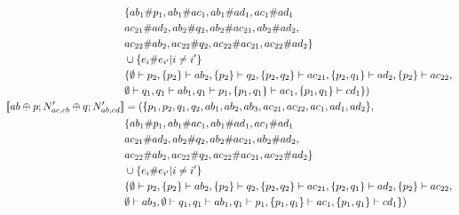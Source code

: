 \begin{example}
\begin{align*}
         & \{ab_1\#p_1,ab_1\#ac_1,ab_1\#ad_1,ac_1\#ad_1 \\
         & ac_{21} \# ad_2, ab_2\# q_2,ab_2\#ac_{21}, ab_2 \# ad_2, \\
         & ac_{22} \# ab_2, ac_{22} \# q_2, ac_{22} \# ac_{21}, 
         ac_{22} \# ad_2 \} \\
         & \cup \{e_{i}\#e_{i'}| i \neq i' \} \\
         & \{\emptyset \vdash p_2, \{p_2\} \vdash ab_2, \{p_2\} \vdash q_2, 
         \{p_2,q_2\} \vdash ac_{21}, \{p_2,q_1\} \vdash ad_2, \{p_2\} 
         \vdash ac_{22},  \\
        & \emptyset \vdash q_1, q_1 \vdash ab_1, q_1 \vdash p_1, 
        \{p_1,q_1\} \vdash ac_1, \{p_1,q_1\} \vdash cd_1\}) \\
        \llbracket ab \oplus p;N'_{ac,cb} \oplus q;N'_{ab,cd} \rrbracket & = (
        \{p_1,p_2,q_1,q_2,ab_1,ab_2,ab_3,ac_{21},ac_{22},ac_1,ad_1,ad_2\}, \\
         & \{ab_1\#p_1,ab_1\#ac_1,ab_1\#ad_1,ac_1\#ad_1 \\
         & ac_{21} \# ad_2, ab_2\# q_2,ab_2\#ac_{21}, ab_2 \# ad_2, \\
         & ac_{22} \# ab_2, ac_{22} \# q_2, ac_{22} \# ac_{21}, 
         ac_{22} \# ad_2 \} \\
         & \cup \{e_{i}\#e_{i'}| i \neq i' \} \\
         & \{\emptyset \vdash p_2, \{p_2\} \vdash ab_2, \{p_2\} \vdash q_2, 
         \{p_2,q_2\} \vdash ac_{21}, \{p_2,q_1\} \vdash ad_2, \{p_2\} 
         \vdash ac_{22},  \\
        & \emptyset \vdash ab_3, \emptyset \vdash q_1, q_1 \vdash ab_1, q_1 \vdash p_1, 
        \{p_1,q_1\} \vdash ac_1, \{p_1,q_1\} \vdash cd_1\}) \\
    \end{align*}
\end{example}